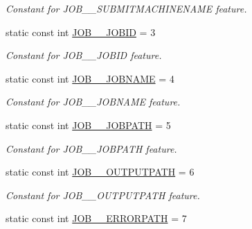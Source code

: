 \begin{DoxyCompactItemize}
\begin{DoxyCompactList}\small\item\em Constant for JOB\_\-\_\-SUBMITMACHINENAME feature. \item\end{DoxyCompactList}\item 
\hypertarget{classTMS__Data_1_1TMS__DataPackage_af28d6ce62ef85781954ba25a310cbb41}{
static const int \hyperlink{classTMS__Data_1_1TMS__DataPackage_af28d6ce62ef85781954ba25a310cbb41}{JOB\_\-\_\-JOBID} = 3}
\label{classTMS__Data_1_1TMS__DataPackage_af28d6ce62ef85781954ba25a310cbb41}

\begin{DoxyCompactList}\small\item\em Constant for JOB\_\-\_\-JOBID feature. \item\end{DoxyCompactList}\item 
\hypertarget{classTMS__Data_1_1TMS__DataPackage_a89e1442230b8713f260484a31c5d878b}{
static const int \hyperlink{classTMS__Data_1_1TMS__DataPackage_a89e1442230b8713f260484a31c5d878b}{JOB\_\-\_\-JOBNAME} = 4}
\label{classTMS__Data_1_1TMS__DataPackage_a89e1442230b8713f260484a31c5d878b}

\begin{DoxyCompactList}\small\item\em Constant for JOB\_\-\_\-JOBNAME feature. \item\end{DoxyCompactList}\item 
\hypertarget{classTMS__Data_1_1TMS__DataPackage_aa5edcdeb2776bb6dc7efe9be923a59b8}{
static const int \hyperlink{classTMS__Data_1_1TMS__DataPackage_aa5edcdeb2776bb6dc7efe9be923a59b8}{JOB\_\-\_\-JOBPATH} = 5}
\label{classTMS__Data_1_1TMS__DataPackage_aa5edcdeb2776bb6dc7efe9be923a59b8}

\begin{DoxyCompactList}\small\item\em Constant for JOB\_\-\_\-JOBPATH feature. \item\end{DoxyCompactList}\item 
\hypertarget{classTMS__Data_1_1TMS__DataPackage_afd593ef175f420230eb0b90c7b2737b0}{
static const int \hyperlink{classTMS__Data_1_1TMS__DataPackage_afd593ef175f420230eb0b90c7b2737b0}{JOB\_\-\_\-OUTPUTPATH} = 6}
\label{classTMS__Data_1_1TMS__DataPackage_afd593ef175f420230eb0b90c7b2737b0}

\begin{DoxyCompactList}\small\item\em Constant for JOB\_\-\_\-OUTPUTPATH feature. \item\end{DoxyCompactList}\item 
\hypertarget{classTMS__Data_1_1TMS__DataPackage_a92e2897314e85458ecc0585a536842a9}{
static const int \hyperlink{classTMS__Data_1_1TMS__DataPackage_a92e2897314e85458ecc0585a536842a9}{JOB\_\-\_\-ERRORPATH} = 7}
\label{classTMS__Data_1_1TMS__DataPackage_a92e2897314e85458ecc0585a536842a9}


\end{DoxyCompactItemize}
